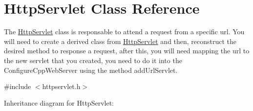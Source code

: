\hypertarget{class_http_servlet}{}\section{Http\+Servlet Class Reference}
\label{class_http_servlet}


The \hyperlink{class_http_servlet}{Http\+Servlet} class is responsable to attend a request from a specific url. You will need to create a derived class from \hyperlink{class_http_servlet}{Http\+Servlet} and then, reconstruct the desired method to response a request, after this, you will need mapping the url to the new servlet that you created, you need to do it into the Configure\+Cpp\+Web\+Server using the method add\+Url\+Servlet.  




{\ttfamily \#include $<$httpservlet.\+h$>$}



Inheritance diagram for Http\+Servlet\+:
